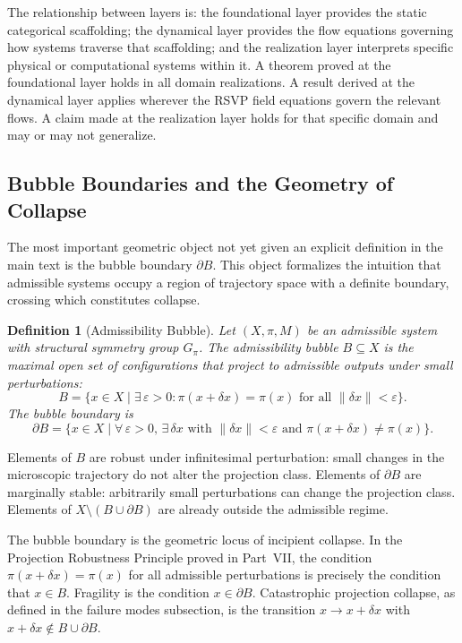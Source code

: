 \documentclass[12pt, a4paper]{article}
\theoremstyle{essaystyle}
\newtheorem{definition}{Definition}
\begin{document}
The relationship between layers is: the foundational layer provides the static
categorical scaffolding; the dynamical layer provides the flow equations governing
how systems traverse that scaffolding; and the realization layer interprets specific
physical or computational systems within it. A theorem proved at the foundational layer
holds in all domain realizations. A result derived at the dynamical layer applies
wherever the RSVP field equations govern the relevant flows. A claim made at the
realization layer holds for that specific domain and may or may not generalize.

\subsection{Bubble Boundaries and the Geometry of Collapse}

The most important geometric object not yet given an explicit definition in the main
text is the bubble boundary $\partial B$. This object formalizes the intuition that
admissible systems occupy a region of trajectory space with a definite boundary,
crossing which constitutes collapse.

\begin{definition}[Admissibility Bubble]
Let $(X, \pi, M)$ be an admissible system with structural symmetry group $G_\pi$.
The \emph{admissibility bubble} $B \subseteq X$ is the maximal open set of
configurations that project to admissible outputs under small perturbations:
\[
B = \bigl\{ x \in X \;\big|\; \exists\,\varepsilon > 0 : \pi(x + \delta x) = \pi(x)
\text{ for all } \|\delta x\| < \varepsilon \bigr\}.
\]
The \emph{bubble boundary} is
\[
\partial B = \bigl\{ x \in X \;\big|\; \forall\,\varepsilon > 0,\,
\exists\,\delta x \text{ with } \|\delta x\| < \varepsilon
\text{ and } \pi(x + \delta x) \neq \pi(x) \bigr\}.
\]
\end{definition}

Elements of $B$ are robust under infinitesimal perturbation: small changes in the
microscopic trajectory do not alter the projection class. Elements of $\partial B$ are
marginally stable: arbitrarily small perturbations can change the projection class.
Elements of $X \setminus (B \cup \partial B)$ are already outside the admissible
regime.

The bubble boundary is the geometric locus of incipient collapse. In the Projection
Robustness Principle proved in Part~VII, the condition $\pi(x + \delta x) = \pi(x)$
for all admissible perturbations is precisely the condition that $x \in B$. Fragility
is the condition $x \in \partial B$. Catastrophic projection collapse, as defined in
the failure modes subsection, is the transition $x \to x + \delta x$ with
$x + \delta x \notin B \cup \partial B$.
\end{document}
